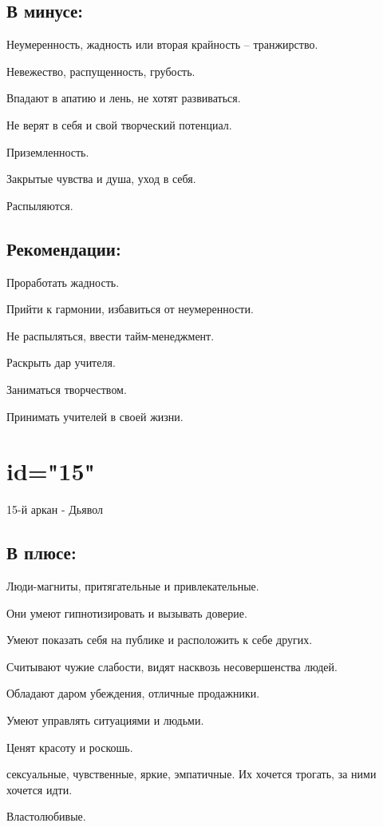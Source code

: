 \subsection{В минусе:}
\item Неумеренность, жадность или вторая крайность – транжирство.
\item Невежество, распущенность, грубость.
\item Впадают в апатию и лень, не хотят развиваться.
\item Не верят в себя и свой творческий потенциал.
\item Приземленность.
\item Закрытые чувства и душа, уход в себя.
\item Распыляются.
\endsubsection

\subsection{Рекомендации:}
\item Проработать жадность.
\item Прийти к гармонии, избавиться от неумеренности.
\item Не распыляться, ввести тайм-менеджмент.
\item Раскрыть дар учителя.
\item Заниматься творчеством.
\item Принимать учителей в своей жизни.
\endsubsection

\endsection

\section{id="15"}{15-й аркан - Дьявол}

\subsection{В плюсе:}
\item Люди-магниты, притягательные и привлекательные.
\item Они умеют гипнотизировать и вызывать доверие.
\item Умеют показать себя на публике и расположить к себе других.
\item Считывают чужие слабости, видят насквозь несовершенства людей.
\item Обладают даром убеждения, отличные продажники.
\item Умеют управлять ситуациями и людьми.
\item Ценят красоту и роскошь.
\item сексуальные, чувственные, яркие, эмпатичные. Их хочется трогать, за ними хочется идти.
\item Властолюбивые.
\endsubsection

